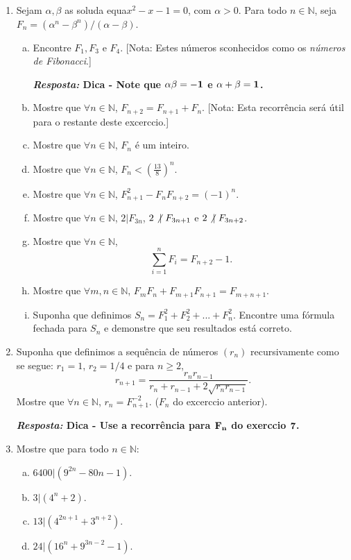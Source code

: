 \begin{enumerate}[{\bf 1.}]
\item Sejam $\alpha,\beta$ as solu\coes da equa\cao $x^2-x-1=0$, com $\alpha >0$. Para todo $n\in\mathbb{N}$, seja $F_n=(\alpha^n-\beta^n)/(\alpha-\beta)$.
\begin{enumerate}[a)]
\item Encontre $F_1,F_3$ e $F_4$. [Nota: Estes n\'umeros s\ao conhecidos como os {\it n\'umeros de Fibonacci}.] 

{\bf{\it Resposta:} Dica - Note que ${\bf \alpha\beta=-1}$ e ${\bf \alpha+\beta=1}$.}

\item Mostre que $\forall n\in\mathbb{N}$, $F_{n+2}=F_{n+1}+F_n$. [Nota: Esta recorr\^encia ser\'a \'util para o restante deste excerc\ih cio.]  
\item Mostre que $\forall n\in\mathbb{N}$, $F_n$ \'e um inteiro.
\item Mostre que $\forall n\in\mathbb{N}$, $F_n<(\frac{13}{8})^n$.
\item Mostre que $\forall n\in\mathbb{N}$, $F^2_{n+1}-F_nF_{n+2}=(-1)^n$.
\item Mostre que $\forall n\in\mathbb{N}$, $2|F_{3n}$, $2\not|\textrm{ } F_{3n+1}$ e $2\not|\textrm{ } F_{3n+2}$.
\item Mostre que $\forall n\in\mathbb{N}$, 
\[
\sum_{i=1}^{n}F_i=F_{n+2}-1.
\]
\item Mostre que $\forall m,n\in\mathbb{N}$, $F_mF_n+F_{m+1}F_{n+1}=F_{m+n+1}$. 
\item Suponha que definimos $S_n=F_{1}^{2}+F_{2}^{2}+...+F_{n}^{2}$. Encontre uma f\'ormula fechada para $S_n$ e demonstre que seu resultados est\'a correto.
\end{enumerate}

\item Suponha que definimos a sequ\^encia de n\'umeros $(r_n)$ recursivamente como se segue: $r_1=1$, $r_2=1/4$ e para $n\geq 2$,
\[
r_{n+1}=\frac{r_nr_{n-1}}{r_n+r_{n-1}+2\sqrt{r_nr_{n-1}}}.
\]
Mostre que $\forall n\in\mathbb{N}$, $r_n=F^{-2}_{n+1}$. ($F_n$ do excerc\ih cio anterior).

{\bf{\it Resposta:} Dica - Use a recorr\^encia para ${\bf F_n}$ do exerc\ih cio ${\bf 7}$.}

\item Mostre que para todo $n\in\mathbb{N}:$
\begin{enumerate}[a)]
\item $6400|(9^{2n}-80n-1)$.
\item $3|(4^n+2)$.
\item $13|(4^{2n+1}+3^{n+2})$.
\item $24|(16^n+9^{3n-2}-1)$.
\end{enumerate}


\end{enumerate}
